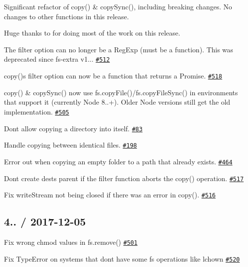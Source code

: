 Significant refactor of {\ttfamily copy()} \& {\ttfamily copy\+Sync()}, including breaking changes. No changes to other functions in this release.

Huge thanks to {\bfseries \href{https://github.com/manidlou}{\tt }} for doing most of the work on this release.


\begin{DoxyItemize}
\item The {\ttfamily filter} option can no longer be a Reg\+Exp (must be a function). This was deprecated since fs-\/extra v1... \href{https://github.com/jprichardson/node-fs-extra/pull/512}{\tt \#512}
\item {\ttfamily copy()}\textquotesingle{}s {\ttfamily filter} option can now be a function that returns a Promise. \href{https://github.com/jprichardson/node-fs-extra/pull/518}{\tt \#518}
\item {\ttfamily copy()} \& {\ttfamily copy\+Sync()} now use {\ttfamily fs.\+copy\+File()}/{\ttfamily fs.\+copy\+File\+Sync()} in environments that support it (currently Node 8..+). Older Node versions still get the old implementation. \href{https://github.com/jprichardson/node-fs-extra/pull/505}{\tt \#505}
\item Don\textquotesingle{}t allow copying a directory into itself. \href{https://github.com/jprichardson/node-fs-extra/issues/83}{\tt \#83}
\item Handle copying between identical files. \href{https://github.com/jprichardson/node-fs-extra/issues/198}{\tt \#198}
\item Error out when copying an empty folder to a path that already exists. \href{https://github.com/jprichardson/node-fs-extra/issues/464}{\tt \#464}
\item Don\textquotesingle{}t create {\ttfamily dest}\textquotesingle{}s parent if the {\ttfamily filter} function aborts the {\ttfamily copy()} operation. \href{https://github.com/jprichardson/node-fs-extra/pull/517}{\tt \#517}
\item Fix {\ttfamily write\+Stream} not being closed if there was an error in {\ttfamily copy()}. \href{https://github.com/jprichardson/node-fs-extra/pull/516}{\tt \#516}
\end{DoxyItemize}

\subsection*{4.. / 2017-\/12-\/05 }


\begin{DoxyItemize}
\item Fix wrong {\ttfamily chmod} values in {\ttfamily fs.\+remove()} \href{https://github.com/jprichardson/node-fs-extra/pull/501}{\tt \#501}
\item Fix {\ttfamily Type\+Error} on systems that don\textquotesingle{}t have some {\ttfamily fs} operations like {\ttfamily lchown} \href{https://github.com/jprichardson/node-fs-extra/pull/520}{\tt \#520}
\end{DoxyItemize}

